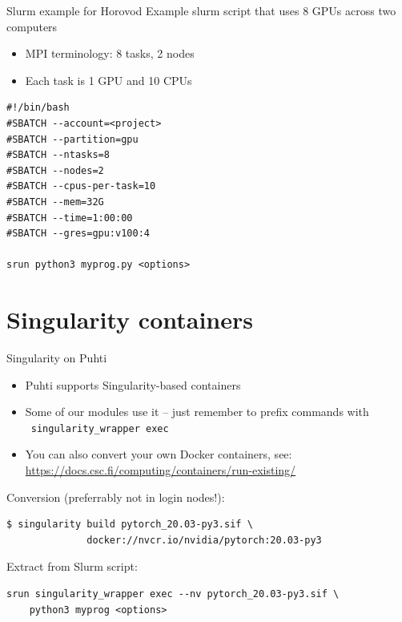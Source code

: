 \documentclass[aspectratio=1610,14pt]{beamer}
\newcommand{\link}[1]{\alert{\url{#1}}}
\begin{document}
\begin{frame}[fragile]{Slurm example for Horovod}
  Example slurm script that uses \alert{8 GPUs} across \alert{two computers}

\begin{itemize}
\item MPI terminology: 8 tasks, 2 nodes
\item Each task is 1 GPU and 10 CPUs
\end{itemize}
  
  \begin{verbatim}
#!/bin/bash
#SBATCH --account=<project>
#SBATCH --partition=gpu
#SBATCH --ntasks=8
#SBATCH --nodes=2
#SBATCH --cpus-per-task=10
#SBATCH --mem=32G
#SBATCH --time=1:00:00
#SBATCH --gres=gpu:v100:4

srun python3 myprog.py <options>
\end{verbatim}
\end{frame}


\section{Singularity containers}

\begin{frame}[fragile]{Singularity on Puhti}
  \begin{itemize}
  \item Puhti supports Singularity-based containers
  \item Some of our modules use it -- just remember to prefix commands with \
    {\tt singularity\_wrapper exec}
  \item You can also convert your own Docker containers, see:
    {\small \link{https://docs.csc.fi/computing/containers/run-existing/}}
  \end{itemize}

  \vspace{5mm}
  Conversion (preferrably not in login nodes!):
  \vspace{-4mm}
\begin{verbatim}
$ singularity build pytorch_20.03-py3.sif \
              docker://nvcr.io/nvidia/pytorch:20.03-py3
\end{verbatim}

Extract from Slurm script:
\vspace{-4mm}
\begin{verbatim}
srun singularity_wrapper exec --nv pytorch_20.03-py3.sif \
    python3 myprog <options>
\end{verbatim}
  
\end{frame}
\end{document}
